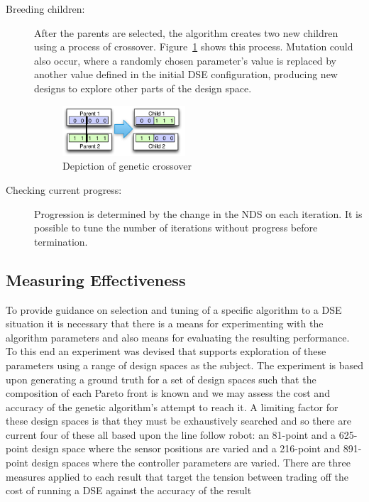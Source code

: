 \begin{description}
\item[Breeding children:] After the parents are selected, the algorithm creates two new children using a process of crossover. Figure~\ref{fig:ga_crossover} shows this process. Mutation could also occur, where a randomly chosen parameter's value is replaced by another value defined in the initial DSE configuration, producing new designs to explore other parts of the design space.

\begin{figure}[h!]
	\centering
	\includegraphics[width=0.45\textwidth]{figures/ga_breeding}
	\caption{Depiction of genetic crossover}
	\label{fig:ga_crossover}
\end{figure}

\item[Checking current progress:] Progression is determined by the change in the NDS on each iteration. It is possible to tune the number of iterations without progress before termination.

\end{description}
\subsection{Measuring Effectiveness}
To provide guidance on selection and tuning of a specific algorithm to a DSE situation it is necessary that there is a means for experimenting with the algorithm parameters and also means for evaluating the resulting performance. To this end an experiment was devised that supports exploration of these parameters using a range of design spaces as the subject.
The experiment is based upon generating a ground truth for a set of design spaces such that the composition of each Pareto front is known and we may assess the cost and accuracy of the genetic algorithm's attempt to reach it. A limiting factor for these design spaces is that they must be exhaustively searched and so there are current four of these all based upon the line follow robot: an 81-point and a 625-point design space where the sensor positions are varied and a 216-point and 891-point design spaces where the controller parameters are varied.
There are three measures applied to each result that target the tension between trading off the cost of running a DSE against the accuracy of the result

